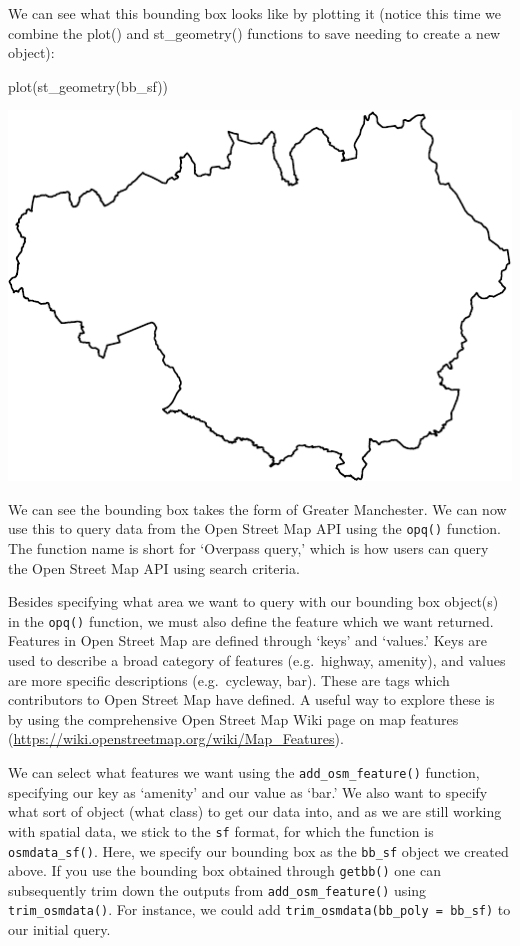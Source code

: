 \documentclass[
]{book}
\makeatletter
\newenvironment{Shaded}{\begin{snugshade}}{\end{snugshade}}
\newcommand{\FunctionTok}[1]{\textcolor[rgb]{0,0,0}{#1}}
\newcommand{\NormalTok}[1]{#1}
\newenvironment{kframe}{%
\medskip{}
\setlength{\fboxsep}{.8em}
 \def\at@end@of@kframe{}%
 \ifinner\ifhmode%
  \def\at@end@of@kframe{\end{minipage}}%
  \begin{minipage}{\columnwidth}%
 \fi\fi%
 \def\FrameCommand##1{\hskip\@totalleftmargin \hskip-\fboxsep
 \colorbox{shadecolor}{##1}\hskip-\fboxsep
     \hskip-\linewidth \hskip-\@totalleftmargin \hskip\columnwidth}%
 \MakeFramed {\advance\hsize-\width
   \@totalleftmargin\z@ \linewidth\hsize
   \@setminipage}}%
 {\par\unskip\endMakeFramed%
 \at@end@of@kframe}
\renewenvironment{Shaded}{\begin{kframe}}{\end{kframe}}
\makeatother
\begin{document}
We can see what this bounding box looks like by plotting it (notice this time we combine the plot() and st\_geometry() functions to save needing to create a new object):

\begin{Shaded}
\begin{Highlighting}[]
\FunctionTok{plot}\NormalTok{(}\FunctionTok{st\_geometry}\NormalTok{(bb\_sf))}
\end{Highlighting}
\end{Shaded}

\includegraphics{crime_mapping_files/figure-latex/plot_bb-1.pdf}

We can see the bounding box takes the form of Greater Manchester. We can now use this to query data from the Open Street Map API using the \texttt{opq()} function. The function name is short for `Overpass query,' which is how users can query the Open Street Map API using search criteria.

Besides specifying what area we want to query with our bounding box object(s) in the \texttt{opq()} function, we must also define the feature which we want returned. Features in Open Street Map are defined through `keys' and `values.' Keys are used to describe a broad category of features (e.g.~highway, amenity), and values are more specific descriptions (e.g.~cycleway, bar). These are tags which contributors to Open Street Map have defined. A useful way to explore these is by using the comprehensive Open Street Map Wiki page on map features (\url{https://wiki.openstreetmap.org/wiki/Map_Features}).

We can select what features we want using the \texttt{add\_osm\_feature()} function, specifying our key as `amenity' and our value as `bar.' We also want to specify what sort of object (what class) to get our data into, and as we are still working with spatial data, we stick to the \texttt{sf} format, for which the function is \texttt{osmdata\_sf()}. Here, we specify our bounding box as the \texttt{bb\_sf} object we created above. If you use the bounding box obtained through \texttt{getbb()} one can subsequently trim down the outputs from \texttt{add\_osm\_feature()} using \texttt{trim\_osmdata()}. For instance, we could add \texttt{trim\_osmdata(bb\_poly\ =\ bb\_sf)} to our initial query.
\end{document}
